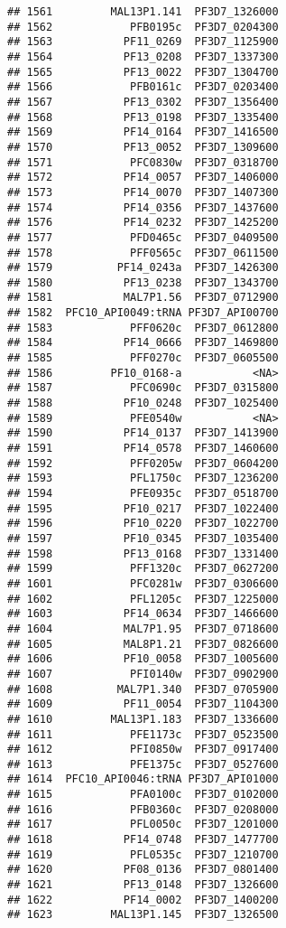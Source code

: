 \documentclass{article}\usepackage[]{graphicx}\usepackage[]{color}
\makeatletter
\newenvironment{kframe}{%
 \def\at@end@of@kframe{}%
 \ifinner\ifhmode%
  \def\at@end@of@kframe{\end{minipage}}%
  \begin{minipage}{\columnwidth}%
 \fi\fi%
 \def\FrameCommand##1{\hskip\@totalleftmargin \hskip-\fboxsep
 \colorbox{shadecolor}{##1}\hskip-\fboxsep
     \hskip-\linewidth \hskip-\@totalleftmargin \hskip\columnwidth}%
 \MakeFramed {\advance\hsize-\width
   \@totalleftmargin\z@ \linewidth\hsize
   \@setminipage}}%
 {\par\unskip\endMakeFramed%
 \at@end@of@kframe}
\newenvironment{knitrout}{}{} %
\makeatother
\begin{document}
\begin{knitrout}
\begin{kframe}
\begin{verbatim}
## 1561         MAL13P1.141  PF3D7_1326000
## 1562            PFB0195c  PF3D7_0204300
## 1563           PF11_0269  PF3D7_1125900
## 1564           PF13_0208  PF3D7_1337300
## 1565           PF13_0022  PF3D7_1304700
## 1566            PFB0161c  PF3D7_0203400
## 1567           PF13_0302  PF3D7_1356400
## 1568           PF13_0198  PF3D7_1335400
## 1569           PF14_0164  PF3D7_1416500
## 1570           PF13_0052  PF3D7_1309600
## 1571            PFC0830w  PF3D7_0318700
## 1572           PF14_0057  PF3D7_1406000
## 1573           PF14_0070  PF3D7_1407300
## 1574           PF14_0356  PF3D7_1437600
## 1576           PF14_0232  PF3D7_1425200
## 1577            PFD0465c  PF3D7_0409500
## 1578            PFF0565c  PF3D7_0611500
## 1579          PF14_0243a  PF3D7_1426300
## 1580           PF13_0238  PF3D7_1343700
## 1581           MAL7P1.56  PF3D7_0712900
## 1582  PFC10_API0049:tRNA PF3D7_API00700
## 1583            PFF0620c  PF3D7_0612800
## 1584           PF14_0666  PF3D7_1469800
## 1585            PFF0270c  PF3D7_0605500
## 1586         PF10_0168-a           <NA>
## 1587            PFC0690c  PF3D7_0315800
## 1588           PF10_0248  PF3D7_1025400
## 1589            PFE0540w           <NA>
## 1590           PF14_0137  PF3D7_1413900
## 1591           PF14_0578  PF3D7_1460600
## 1592            PFF0205w  PF3D7_0604200
## 1593            PFL1750c  PF3D7_1236200
## 1594            PFE0935c  PF3D7_0518700
## 1595           PF10_0217  PF3D7_1022400
## 1596           PF10_0220  PF3D7_1022700
## 1597           PF10_0345  PF3D7_1035400
## 1598           PF13_0168  PF3D7_1331400
## 1599            PFF1320c  PF3D7_0627200
## 1601            PFC0281w  PF3D7_0306600
## 1602            PFL1205c  PF3D7_1225000
## 1603           PF14_0634  PF3D7_1466600
## 1604           MAL7P1.95  PF3D7_0718600
## 1605           MAL8P1.21  PF3D7_0826600
## 1606           PF10_0058  PF3D7_1005600
## 1607            PFI0140w  PF3D7_0902900
## 1608          MAL7P1.340  PF3D7_0705900
## 1609           PF11_0054  PF3D7_1104300
## 1610         MAL13P1.183  PF3D7_1336600
## 1611            PFE1173c  PF3D7_0523500
## 1612            PFI0850w  PF3D7_0917400
## 1613            PFE1375c  PF3D7_0527600
## 1614  PFC10_API0046:tRNA PF3D7_API01000
## 1615            PFA0100c  PF3D7_0102000
## 1616            PFB0360c  PF3D7_0208000
## 1617            PFL0050c  PF3D7_1201000
## 1618           PF14_0748  PF3D7_1477700
## 1619            PFL0535c  PF3D7_1210700
## 1620           PF08_0136  PF3D7_0801400
## 1621           PF13_0148  PF3D7_1326600
## 1622           PF14_0002  PF3D7_1400200
## 1623         MAL13P1.145  PF3D7_1326500

\end{verbatim}
\end{kframe}
\end{knitrout}
\end{document}
